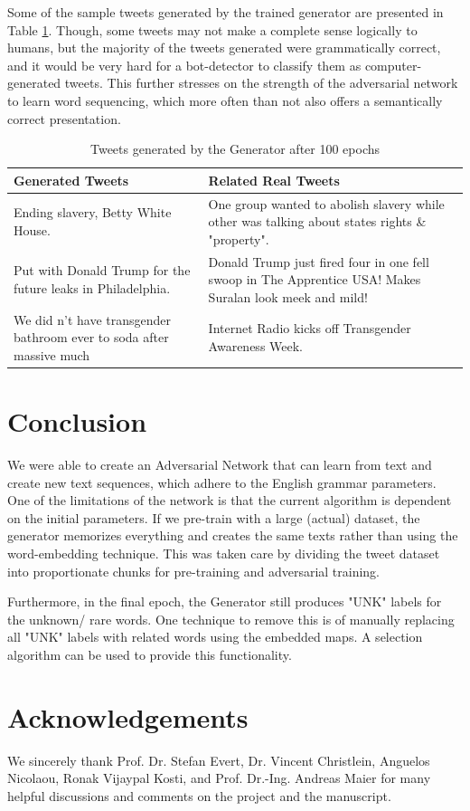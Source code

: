 \documentclass[conference]{IEEEtran}
\begin{document}
Some of the sample tweets generated by the trained generator are presented in Table \ref{tab:gen_samples}. Though, some tweets may not make a complete sense logically to humans, but the majority of the tweets generated were grammatically correct, and it would be very hard for a bot-detector to classify them as computer-generated tweets. This further stresses on the strength of the adversarial network to learn word sequencing, which more often than not also offers a semantically correct presentation. 

\begin{table}[h]
    \centering
     \caption{Tweets generated by the Generator after 100 epochs}
    \begin{tabular}{|p{3cm}|p{4.5cm}|}
    Generated Tweets &   Related Real Tweets \\
    \hline 
   Ending slavery, Betty White House. & One group wanted to abolish slavery while other was talking about states rights \& "property". \\
    
    Put with Donald Trump for the future leaks in Philadelphia. & Donald Trump just fired four in one fell swoop in The Apprentice USA! Makes Suralan look meek and mild! \\
    
    We did n’t have transgender bathroom ever to soda after massive much & Internet Radio kicks off Transgender Awareness Week. \\
   \end{tabular}
   \label{tab:gen_samples}
\end{table}




\section{Conclusion}
We were able to create an Adversarial Network that can learn from text and create new text sequences, which adhere to the English grammar parameters. One of the limitations of the network is that the current algorithm is dependent on the initial parameters. If we pre-train with a large (actual) dataset, the generator memorizes everything and creates the same texts rather than using the word-embedding technique. This was taken care by dividing the tweet dataset into proportionate chunks for pre-training and adversarial training. 

Furthermore, in the final epoch, the Generator still produces "UNK" labels for the unknown/ rare words. One technique to remove this is of manually replacing all "UNK" labels with related words using the embedded maps. A selection algorithm can be used to provide this functionality.




\small


\section{Acknowledgements}
We sincerely thank Prof. Dr. Stefan Evert, Dr. Vincent Christlein, Anguelos Nicolaou, Ronak Vijaypal Kosti, and Prof. Dr.-Ing. Andreas Maier for many helpful discussions and comments on the project and the manuscript.
\end{document}
